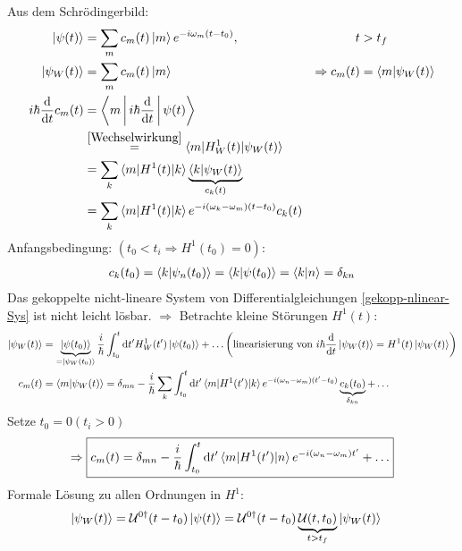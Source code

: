 	Aus dem Schrödingerbild: 
		\begin{align}
			\ket{\psi(t)} &= \sum_m c_m(t) \ket{m} e^{-i \omega_m (t-t_0)} ,& t&>t_f \nonumber \\
			\ket{\psi_W(t)} &= \sum_m c_m(t) \ket{m} &\Rightarrow c_m(t) &= \braket{m | \psi_W(t)} \nonumber \\
			i\hbar \frac{\mathrm{d}}{\mathrm{d} t} c_m(t) 
			&= \Braket{m | i\hbar \frac{\mathrm{d}}{\mathrm{d} t} | \psi(t)} \nonumber\\
			&\overset{\eqref{Wechselwirkung}}{=} \braket{m | H^1_W(t) | \psi_W(t)} \nonumber\\
			&= \sum_k \braket{m | H^1(t) | k} \underbrace{\braket{k | \psi_W(t)}}_{\substack{c_k(t)}} \nonumber\\ 
			\label{gekopp-nlinear-Sys}
			&= \sum_k \braket{m | H^1(t) | k} e^{-i(\omega_k - \omega_m)(t - t_0)} c_k(t) 
		\end{align}
	Anfangsbedingung: $(t_0 < t_i \Rightarrow H^1(t_0) = 0):$
		\begin{align*} 
			c_k(t_0) = \braket{k | \psi_n(t_0)} = \braket{k | \psi(t_0)} = \braket{k | n} = \delta_{kn}
		\end{align*} 	
	Das gekoppelte nicht-lineare System von Differentialgleichungen \eqref{gekopp-nlinear-Sys} ist nicht leicht lösbar. $\Rightarrow$ Betrachte \glqq kleine\grqq{} Störungen $H^1(t)$: 
		\begin{align*}
			\ket{\psi_W(t)} &= \underbrace{\ket{\psi(t_0)}}_{\substack{=\ket{\psi_W(t_0)}}} 
			\frac{i}{\hbar} \int_{t_0}^{t} \mathrm{d} t' H^1_W(t') \ket{\psi(t_0)} + \ldots 
			\left( \text{linearisierung von~} i\hbar \frac{\mathrm{d}}{\mathrm{d} t} \ket{\psi_W(t)} = H^1(t) \ket{\psi_W(t)}\right) \\
			c_m(t) &= \braket{m | \psi_W(t)} 
			= \delta_{mn} - \frac{i}{\hbar} \sum_k \int_{t_0}^{t} \mathrm{d} t' \braket{m | H^1(t') | k} e^{-i(\omega_n - \omega_m)(t'-t_0)} 
			\underbrace{c_k(t_0)}_{\substack{\delta_{kn}}} + \ldots
		\end{align*}
	Setze $t_0=0 (t_i>0)$
		\begin{equation*}
			\Rightarrow \boxed{c_m(t) = \delta_{mn} 
				- \frac{i}{\hbar} \int_{t_0}^{t} \mathrm{d} t' \braket{m | H^1(t') | n} e^{-i(\omega_n - \omega_m) t'} + \ldots}
		\end{equation*}
	Formale Lösung zu allen Ordnungen in $H^1$:	
		\begin{align*}
			\ket{\psi_W(t)} &= \mathcal{U}^{0\dagger} (t-t_0) \ket{\psi(t)}
			= \mathcal{U}^{0\dagger} (t-t_0) \underbrace{\mathcal{U} (t,t_0)}_{\substack{t>t_f}} \ket{\psi_W(t)}
		\end{align*}
